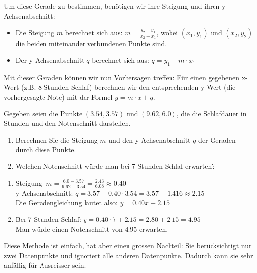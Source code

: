 Um diese Gerade zu bestimmen, benötigen wir ihre Steigung und ihren y-Achsenabschnitt:

\begin{itemize}
    \item Die Steigung $m$ berechnet sich aus: $m = \frac{y_2 - y_1}{x_2 - x_1}$, wobei $(x_1, y_1)$ und $(x_2, y_2)$ die beiden miteinander verbundenen Punkte sind.
    \item Der y-Achsenabschnitt $q$ berechnet sich aus: $q = y_1 - m \cdot x_1$
\end{itemize}

Mit dieser Geraden können wir nun Vorhersagen treffen: Für einen gegebenen x-Wert (z.B. 8 Stunden Schlaf) berechnen wir den entsprechenden y-Wert (die vorhergesagte Note) mit der Formel $y = m \cdot x + q$.

\begin{myexercise}
    Gegeben seien die Punkte $(3.54, 3.57)$ und $(9.62, 6.0)$, die die Schlafdauer in Stunden und den Notenschnitt darstellen.
    \begin{enumerate}
        \item Berechnen Sie die Steigung $m$ und den y-Achsenabschnitt $q$ der Geraden durch diese Punkte.
        \item Welchen Notenschnitt würde man bei 7 Stunden Schlaf erwarten?
    \end{enumerate}
    \begin{myanswer}
        \begin{enumerate}
            \item Steigung: $m = \frac{6.0 - 3.57}{9.62 - 3.54} = \frac{2.43}{6.08} \approx 0.40$\\
                  y-Achsenabschnitt: $q = 3.57 - 0.40 \cdot 3.54 = 3.57 - 1.416 \approx 2.15$\\
                  Die Geradengleichung lautet also: $y = 0.40x + 2.15$
            \item Bei 7 Stunden Schlaf: $y = 0.40 \cdot 7 + 2.15 = 2.80 + 2.15 = 4.95$\\
                  Man würde einen Notenschnitt von 4.95 erwarten.
        \end{enumerate}
    \end{myanswer}
\end{myexercise}

Diese Methode ist einfach, hat aber einen grossen Nachteil: Sie berücksichtigt nur zwei Datenpunkte und ignoriert alle anderen Datenpunkte. Dadurch kann sie sehr anfällig für Ausreisser sein.

